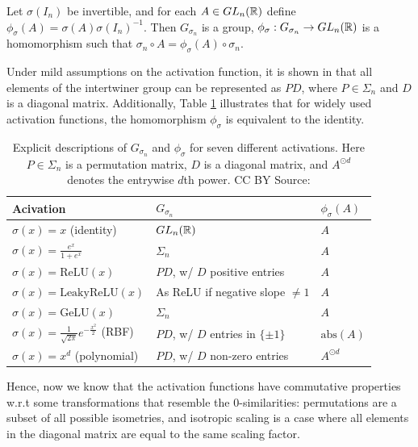 \documentclass[../main.tex]{subfiles}
\begin{document}
\begin{lemma}
  \label{lem:intertwiner}
  Let $\sigma(I_n)$ be invertible, and for each $A \in GL_{n}(\mathbb{R})$ define $\phi_\sigma(A) = \sigma(A) \sigma(I_n)^{-1}$. Then $G_{\sigma_n}$ is a group, $\phi_\sigma: G_{\sigma_n} \to GL_{n}(\mathbb{R})$ is a homomorphism  such that $\sigma_n \circ A = \phi_{\sigma}(A) \circ \sigma_n$. 
\end{lemma}


Under mild assumptions on the activation function, it is shown in \cite{godfrey_symmetries_2023} that all elements of the intertwiner group can be represented as $PD$, where $P \in \Sigma_n$ and $D$ is a diagonal matrix. Additionally, Table \ref{tab:intertwiner-groups} illustrates that for widely used activation functions, the homomorphism $\phi_\sigma$ is equivalent to the identity. 

\begin{table}[ht]
\centering
\begin{tabular}[b]{lll}
\toprule
     Acivation &     $G_{\sigma_n}$ &     $\phi_\sigma(A)$ \\
\toprule

$\sigma(x) = x$ (identity) & $GL_n(\mathbb{R})$ & $A$\\
\midrule[.05pt]
$\sigma(x) = \frac{e^x}{1+e^x}$ & $\Sigma_n$ & $A$\\
\midrule[.05pt]
$\sigma(x) = \text{ReLU}(x)$ & $P D$, w/ $D$ positive entries & $A$\\
\midrule[.05pt]
$\sigma(x) = \text{LeakyReLU}(x)$ & As ReLU if negative slope $\neq 1$ & $A$ \\
\midrule[.05pt]
 $\sigma(x) = \text{GeLU}(x)$  & $\Sigma_n$ & $A$\\
 \midrule[.05pt]
$\sigma(x) = \frac{1}{\sqrt{2 \pi}} e^{-\frac{x^2}{2}}$ (RBF) & $P D$, w/ $D$ entries in $\{\pm 1\}$ & 
$\mathrm{abs}(A)$\\
\midrule[.05pt]
$\sigma(x) = x^d$ (polynomial) &  $P D$, w/ $D$ non-zero entries
& $A^{\odot  d}$
\end{tabular}
\caption{Explicit descriptions of $G_{\sigma_n}$ and $\phi_{\sigma}$ for seven different activations. Here $P \in \Sigma_n$ is a permutation matrix, $D$ is a diagonal matrix, and $A^{\odot d}$ denotes the entrywise $d$th power. CC BY Source: \cite{godfrey_symmetries_2023}}
\label{tab:intertwiner-groups} 
\end{table}

Hence, now we know that the activation functions have commutative properties w.r.t some transformations that resemble the $0$-similarities: permutations are a subset of all possible isometries, and isotropic scaling is a case where all elements in the diagonal matrix are equal to the same scaling factor.
\end{document}
